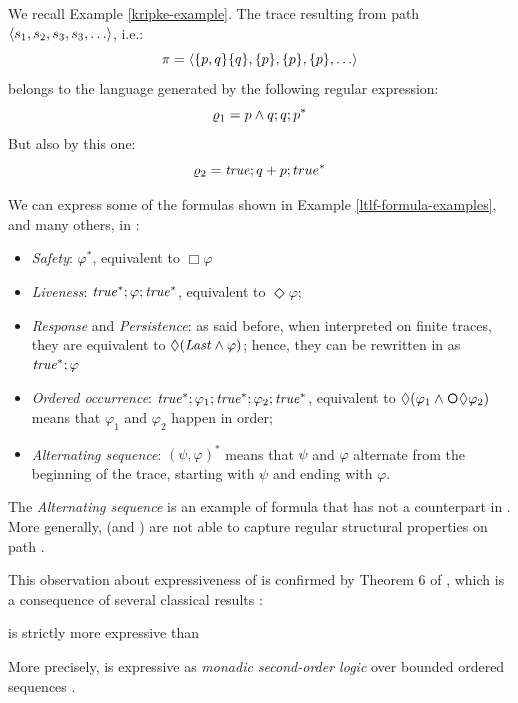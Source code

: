 \begin{example}\label{regex-kripke-example}
	We recall Example \ref{kripke-example}. The trace resulting from path $\tup{s_1, s_2, s_3, s_3, \dots}$, i.e.:
	\[
	\trace = \tup{\set{p, q}\set{q}, \set{p}, \set{p},\set{p}, \dots}
	\]
	belongs to the language generated by the following regular expression: 
	\[
	\varrho_1 = p \wedge q ; q ; p^*
	\]
	But also by this one:
	\[
	\varrho_2 = \mathit{true} ; q + p ; true^*
	\]
\end{example}
\begin{example}\label{regex-temp-examples}
	We can express some of the formulas shown in Example \ref{ltlf-formula-examples}, and many others, in \RE:
	\begin{itemize}
		\item \emph{Safety}: $\varphi^*$,  equivalent to $\Box \varphi$
		\item \emph{Liveness}: $\mathit{true}^*; \varphi; \mathit{true}^*$, equivalent to $\Diamond \varphi$;
		\item \emph{Response} and \emph{Persistence}: as said before, when interpreted on finite traces, they are equivalent to $\Diamond(\mathit{Last} \wedge \varphi)$; hence, they can be rewritten in \RE as $\mathit{true}^*; \varphi$
		\item \emph{Ordered occurrence}: $\mathit{true}^*; \varphi_1; \mathit{true}^*; \varphi_2; \mathit{true}^*$, equivalent to $\Diamond (\varphi_1 \lAND \Next \Diamond \varphi_2)$ means that $\varphi_1$ and $\varphi_2$ happen in order;
		\item \emph{Alternating sequence}: $(\psi, \varphi)^*$ means that $\psi$ and $\varphi$ alternate from the beginning of the trace, starting with $\psi$ and ending with $\varphi$.
	\end{itemize}
	The \emph{Alternating sequence} is an example of formula that has not a counterpart in \LTLf. More generally, \LTLf (and \LTL) are not able to capture regular structural properties on path \citep{Wolper1981TemporalLC}.
		
\end{example}

This observation about expressiveness of \RE is confirmed by Theorem 6 of \citep{de2013linear}, which is a consequence of several classical results \citep{doi:10.1002/malq.19600060105, 10.2307/1993511, zbMATH03186872, THOMAS1979148}:
\begin{theorem}
	 \RE is strictly more expressive than \LTLf
\end{theorem}

More precisely, \RE is expressive as \emph{monadic second-order logic} \MSO over bounded ordered sequences \citep{Khoussainov:2001:ATA:558914}.
